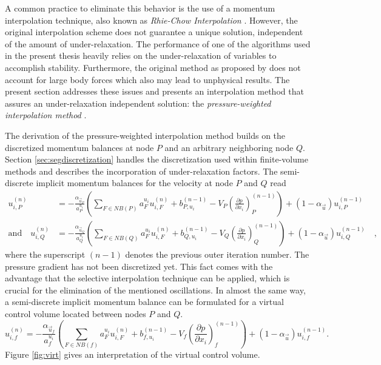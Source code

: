 A common practice to eliminate this behavior is the use of a momentum interpolation technique, also known as \emph{Rhie-Chow Interpolation} \cite{rhie82}. However, the original interpolation scheme does not guarantee a unique solution, independent of the amount of under-relaxation. The performance of one of the algorithms used in the present thesis heavily relies on the under-relaxation of variables to accomplish stability. Furthermore, the original method as proposed by \cite{rhie82} does not account for large body forces which also may lead to unphysical results. The present section addresses these issues and presents an interpolation method that assures an under-relaxation independent solution: the \emph{pressure-weighted interpolation method} \cite{miller88}.

The derivation of the pressure-weighted interpolation method builds on the discretized momentum balances at node \(P\) and an arbitrary neighboring node \(Q\). Section \ref{sec:segdiscretization} handles the discretization used within finite-volume methods and describes the incorporation of under-relaxation factors. The semi-discrete implicit momentum balances for the velocity at node \(P\) and \(Q\) read
\begin{align*}
    u_{i,P}^{(n)} 
    &= 
    - \frac{\alpha_{\vec{u}_P}}{a_P^{u_i}} \left(\sum_{F \in NB(P)} a_F^{u_i} u_{i,F}^{(n)}
    +                                     b_{P,u_i}^{(n-1)} 
    -                                     V_P\left(\frac{\partial p}{\partial x_i}\right)_P^{(n-1)} \right)
    + \left(1 - \alpha_{\vec{u}}\right) u_{i,P}^{(n-1)}  \\[1em]
    \text{and} \quad
    u_{i,Q}^{(n)} 
    &= 
    - \frac{\alpha_{\vec{u}_Q}}{a_Q^{u_i}} \left(\sum_{F \in NB(Q)} a_F^{u_i} u_{i,F}^{(n)}
    +                                     b_{Q,u_i}^{(n-1)} 
    -                                     V_Q\left(\frac{\partial p}{\partial x_i}\right)_Q^{(n-1)}   \right)
    + \left(1 - \alpha_{\vec{u}}\right) u_{i,Q}^{(n-1)} \quad,
\end{align*}
where the superscript \((n-1)\) denotes the previous outer iteration number. The pressure gradient has not been discretized yet. This fact comes with the advantage that the selective interpolation technique \cite{schaefer99} can be applied, which is crucial for the elimination of the mentioned oscillations. In almost the same way, a semi-discrete implicit momentum balance can be formulated for a virtual control volume located between nodes \(P\) and \(Q\). \begin{equation}
  \label{eq:virtualu}
  u_{i,f}^{(n)} 
  = 
  - \frac{\alpha_{\vec{u}_f}}{a_f^{u_i}} \left(\sum_{F \in NB(f)} a_F^{u_i} u_{i,F}^{(n)} 
  +                                     b_{f,u_i}^{(n-1)} 
  -                                     V_f\left(\frac{\partial p}{\partial x_i}\right)_f^{(n-1)}  \right)
  + \left(1 - \alpha_{\vec{u}}\right) u_{i,f}^{(n-1)}.
\end{equation}
Figure \ref{fig:virt} gives an interpretation of the virtual control volume.

